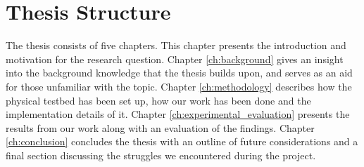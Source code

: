 \section{Thesis Structure}

The thesis consists of five chapters. This chapter presents the introduction and motivation for the research question. Chapter \ref{ch:background} gives an insight into the background knowledge that the thesis builds upon, and serves as an aid for those unfamiliar with the topic. Chapter \ref{ch:methodology} describes how the physical testbed has been set up, how our work has been done and the implementation details of it. Chapter \ref{ch:experimental_evaluation} presents the results from our work along with an evaluation of the findings. Chapter \ref{ch:conclusion} concludes the thesis with an outline of future considerations and a final section discussing the struggles we encountered during the project.